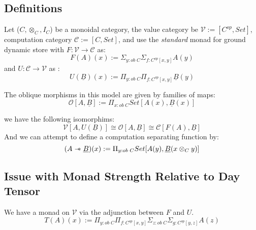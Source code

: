 \documentclass{article}
\newcommand{\sep}{\mathrel{-\mkern-6mu*}}
\begin{document}
\subsection{Definitions}
Let ($C, \otimes_C , I_C$) be a monoidal category, the value category be $\mathcal{V} := [C^{op} , Set]$, 
computation category $\mathcal{C} := [C , Set]$, and use the \textit{standard}
monad for ground dynamic store with $F : \mathcal{V} \rightarrow \mathcal{C}$ as:
\[
    F(A)(x) := \Sigma_{y : ob \;C}\Sigma_{f : C^{op}[ x , y ]}A(y)    
\]
and $U : \mathcal{C} \rightarrow \mathcal{V}$ as :
\[
    U(\underline{B})(x) := \Pi_{y : ob \; C}\Pi_{f : C^{op}[ x , y]}\underline{B}(y)   
\]

The oblique morphisms in this model are given by families of maps:
\[
    \mathcal{O}[A , \underline{B}] := \Pi_{x : ob \; C} Set[A(x) , \underline{B}(x)]   
\]

we have the following isomorphims:
\[
    \mathcal{V}[A , U(\underline{B})] \cong \mathcal{O}[A , \underline{B}] \cong \mathcal{C}[F(A) , \underline{B}]   
\]
And we can attempt to define a computation separating function by:
\[
    (A \sep \underline{B})(x) := \Pi_{y : ob \;C} Set[A(y), \underline{B}(x \otimes_C y)]
\]

\subsection{Issue with Monad Strength Relative to Day Tensor}
We have a monad on $\mathcal{V}$ via the adjunction between $F$ and $U$.
\[
    T(A)(x) := \Pi_{y : ob \; C}\Pi_{f : C^{op}[ x , y]}\Sigma_{z : ob \;C}\Sigma_{g : C^{op}[ y , z ]}A(z) 
\]
\end{document}
